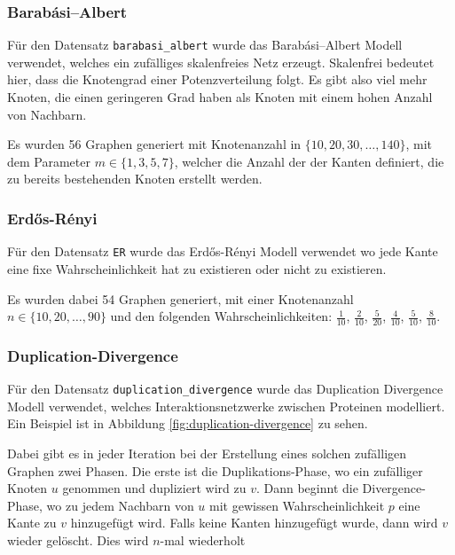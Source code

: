 \documentclass[12pt,a4paper,onecolumn,oneside,titlepage]{article}
\newcommand{\vars}{\texttt}
\begin{document}
\subsubsection{Barabási–Albert}
Für den Datensatz \vars{barabasi\_albert} wurde das Barabási–Albert Modell verwendet, welches ein zufälliges skalenfreies Netz erzeugt\cite{Albert02}.
Skalenfrei bedeutet hier, dass die Knotengrad einer Potenzverteilung folgt. Es gibt also viel mehr Knoten, die einen geringeren Grad haben als Knoten mit einem hohen Anzahl von Nachbarn. 

Es wurden 56 Graphen generiert mit Knotenanzahl in $\{10,20,30, \ldots, 140\}$, mit dem Parameter $m \in \{1,3,5,7\}$, welcher die Anzahl der der Kanten definiert, die zu bereits bestehenden Knoten erstellt werden.
\subsubsection{Erdős-Rényi}
Für den Datensatz \vars{ER} wurde das Erdős-Rényi Modell verwendet\cite{Gilbert59,Batagelj05} wo jede Kante eine fixe Wahrscheinlichkeit hat zu existieren oder nicht zu existieren.

Es wurden dabei 54 Graphen generiert, mit einer Knotenanzahl $n \in \{10,20, \ldots ,90\}$ und den folgenden Wahrscheinlichkeiten: $\frac{1}{10}$, $\frac{2}{10}$, $\frac{5}{20}$, $\frac{4}{10}$, $\frac{5}{10}$, $\frac{8}{10}$.


\subsubsection{Duplication-Divergence}
Für den Datensatz \vars{duplication\_divergence} wurde das Duplication Divergence Modell verwendet\cite{Ispolatov05}, welches Interaktionsnetzwerke zwischen Proteinen modelliert. Ein Beispiel ist in Abbildung \ref{fig:duplication-divergence} zu sehen.

Dabei gibt es in jeder Iteration bei der Erstellung eines solchen zufälligen Graphen zwei Phasen. Die erste ist die Duplikations-Phase, wo ein zufälliger Knoten $u$ genommen und dupliziert wird zu $v$. Dann beginnt die Divergence-Phase, wo zu jedem Nachbarn von $u$ mit gewissen Wahrscheinlichkeit $p$ eine Kante zu $v$ hinzugefügt wird. Falls keine Kanten hinzugefügt wurde, dann wird $v$ wieder gelöscht. Dies wird $n$-mal wiederholt 
\end{document}
